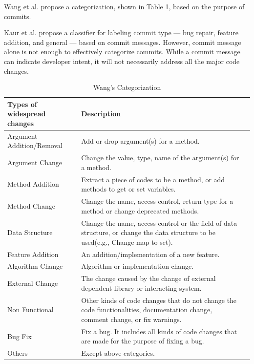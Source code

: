 Wang et al. propose a categorization, shown in Table \ref{tab:wang}, based on the purpose of commits.

Kaur et al. \cite{kaur_2018} propose a classifier for labeling commit type --- bug repair, feature addition, and general --- based on commit messages.
However, commit message alone is not enough to effectively categorize commits. While a commit message can indicate developer intent, it will not necessarily address all the major code changes. 

\begin{table}[htbp]
  \centering
  \caption{Wang's Categorization}
    \begin{tabular}{|p{8em}|p{17.5em}r|}
    \hline
    Types of widespread changes & \multicolumn{1}{p{17.5em}|}{Description} \\
    \hline
    Argument Addition/Removal & \multicolumn{1}{p{17.5em}|}{Add or drop argument(s) for a method.} \\
    \hline
    Argument Change & \multicolumn{1}{p{17.5em}|}{Change the value, type, name of the argument(s) for a method.} \\
    \hline
    Method Addition  & \multicolumn{1}{p{17.5em}|}{Extract a piece of codes to be a method, or add methods to get or set variables.} \\
    \hline
    Method Change  & \multicolumn{1}{p{17.5em}|}{Change the name, access control, return type for a method or change deprecated methods.} \\
    \hline
    Data Structure  & \multicolumn{1}{p{17.5em}|}{Change the name, access control or the field of data structure, or change the data structure to be used(e.g., Change map to set).} \\
    \hline
    Feature Addition  & \multicolumn{1}{p{17.5em}|}{An addition/implementation of a new feature.} \\
    \hline
    Algorithm Change  & \multicolumn{1}{p{17.5em}|}{Algorithm or implementation change.} \\
    \hline
    External Change  & \multicolumn{1}{p{17.5em}|}{The change caused by the change of external dependent library or interacting system.} \\
    \hline
    Non Functional  & \multicolumn{1}{p{17.5em}|}{Other kinds of code changes that do not change the code functionalities, documentation change, comment change, or fix warnings.} \\
    \hline
    Bug Fix  & \multicolumn{1}{p{17.5em}|}{Fix a bug. It includes all kinds of code changes that are made for the purpose of fixing a bug.} \\
    \hline
    Others  & \multicolumn{1}{p{17.5em}|}{Except above categories.} \\
    \hline
    \end{tabular}%
  \label{tab:wang}%
\end{table}%


